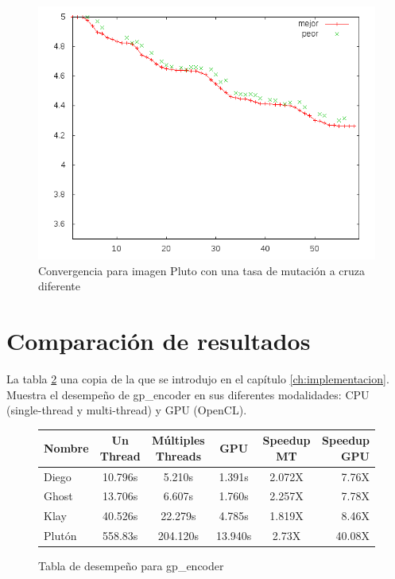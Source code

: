 \begin{figure}
    \includegraphics[width=1.0\textwidth]{plot_pluto_tweak}
    \caption{Convergencia para imagen Pluto con una tasa de mutación a cruza diferente}
    \label{img:plot-pluto2}
\end{figure}

\section{Comparación de resultados}

La tabla \ref{fig:perf_table} una copia de la que se introdujo en el capítulo
\ref{ch:implementacion}. Muestra el desempeño de gp\_encoder en sus
diferentes modalidades: CPU (single-thread y multi-thread) y GPU (OpenCL).

\begin{figure}[h!]
    \begin{tabular}{ |l c c c c r| }
        \hline
        Nombre &  Un Thread & Múltiples Threads & GPU & Speedup MT & Speedup GPU \\
        \hline
        Diego & 10.796s & 5.210s & 1.391s  & 2.072X & 7.76X \\
        Ghost & 13.706s & 6.607s & 1.760s  & 2.257X & 7.78X \\
        Klay & 40.526s & 22.279s & 4.785s  & 1.819X & 8.46X \\%
        Plutón & 558.83s & 204.120s & 13.940s & 2.73X & 40.08X \\ %
        \hline
    \end{tabular}
    \caption{Tabla de desempeño para gp\_encoder}
    \label{fig:perf_table}
\end{figure}

